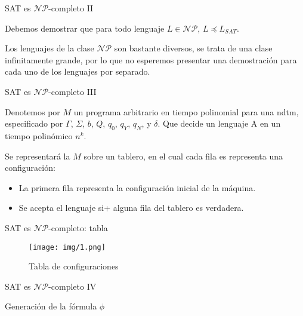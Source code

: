 \documentclass[10pt, mathserif, profesionalfont]{beamer}
\begin{document}
\begin{frame}{SAT es $\mathcal{NP}$-completo II}

\begin{block}{}
  Debemos demostrar que para todo lenguaje $L\in \mathcal{NP}$,
  $L \preceq L_{SAT}$.
\end{block}

\begin{block}{}
  Los lenguajes de la clase $\mathcal{NP}$
  son bastante diversos, se trata de una clase infinitamente grande, por lo que
  no esperemos presentar una demostración para cada uno de los lenguajes por
  separado.
\end{block}

\end{frame}


\begin{frame}{SAT es $\mathcal{NP}$-completo III}

\begin{block}{}
  Denotemos por $M$ un programa arbitrario en tiempo polinomial
  para una \gls{ndtm}, especificado por $\Gamma$, $\Sigma$, $b$, $Q$, $q_0$,
  $q_Y$, $q_N$, y $\delta$. Que decide un lenguaje A en un tiempo polinómico
  $n^k$.
\end{block}

\begin{block}{}
  Se representará la $M$ sobre un tablero, en el cual cada fila es representa una configuración:
  \begin{itemize}
  	\item La primera fila representa la configuración inicial de la máquina.
    \item Se acepta el lenguaje si+ alguna fila del tablero es verdadera.
  \end{itemize}
\end{block}

\end{frame}

\begin{frame}{SAT es $\mathcal{NP}$-completo: tabla}

  \begin{figure}[f]
  \texttt{[image: img/1.png]}
  \caption{Tabla de configuraciones}
  \end{figure}

\end{frame}

\begin{frame}{SAT es $\mathcal{NP}$-completo IV}

\begin{block}{Generación de la fórmula $\phi$}
\end{block}

\end{frame}
\end{document}
